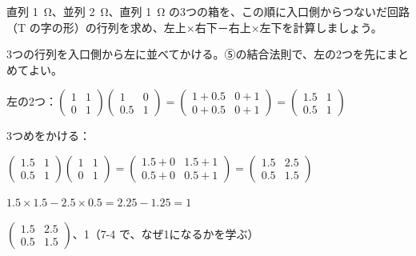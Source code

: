\begin{reidai}[箱を3つつなぐ]
直列 \qty{1}{\ohm}、並列 \qty{2}{\ohm}、直列 \qty{1}{\ohm} の3つの箱を、この順に入口側からつないだ回路（T の字の形）の行列を求め、左上×右下－右上×左下を計算しましょう。\par
\kangaekata 3つの行列を入口側から左に並べてかける。⑤の結合法則で、左の2つを先にまとめてよい。\par
\shiki\kviids{}\zw{} 左の2つ：$\begin{pmatrix}1&1\\0&1\end{pmatrix}\begin{pmatrix}1&0\\0.5&1\end{pmatrix}=\begin{pmatrix}1+0.5&0+1\\0+0.5&0+1\end{pmatrix}=\begin{pmatrix}1.5&1\\0.5&1\end{pmatrix}$\par
\kviida 3つめをかける：\par
\kviidb $\begin{pmatrix}1.5&1\\0.5&1\end{pmatrix}\begin{pmatrix}1&1\\0&1\end{pmatrix}=\begin{pmatrix}1.5+0&1.5+1\\0.5+0&0.5+1\end{pmatrix}=\begin{pmatrix}1.5&2.5\\0.5&1.5\end{pmatrix}$\par
\kviida $1.5\times1.5-2.5\times0.5=2.25-1.25=1$\par
\kotae\kviids{}\zw{} $\begin{pmatrix}1.5&2.5\\0.5&1.5\end{pmatrix}$、1（7-4 で、なぜ1になるかを学ぶ）
\end{reidai}


